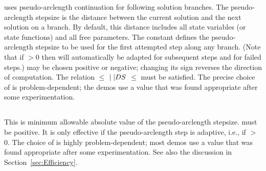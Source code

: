  \AUTO uses pseudo-arclength continuation for following solution branches.
 The pseudo-arclength stepsize is the distance between
 the current solution and the next solution on a branch.
 By default, this distance includes all state variables
 (or state functions) and all free parameters.
 The constant  defines the pseudo-arclength stepsize to be used for the
 first attempted step along any branch. 
 (Note that if $>$0 then  will automatically be adapted
 for subsequent steps and for failed steps.)
  may be chosen positive or negative; changing its sign 
 reverses the direction of computation.
 The relation  $\le$ $\mid{\tt \mid}{ DS}$ $\le$  must be satisfied.
 The precise choice of  is problem-dependent; the demos use a value 
 that was found appropriate after some experimentation.
 

\subsection{}  \label{sec:DSMIN}


 This is minimum allowable absolute value of the pseudo-arclength 
 stepsize.  must be positive.
 It is only effective if the pseudo-arclength step is adaptive,
 i.e., if $>$0.
 The choice of  is highly problem-dependent;
 most demos use a value that was found appropriate after some
 experimentation.
 See also the discussion in Section~\ref{sec:Efficiency}.

\subsection{}  \label{sec:DSMAX}


